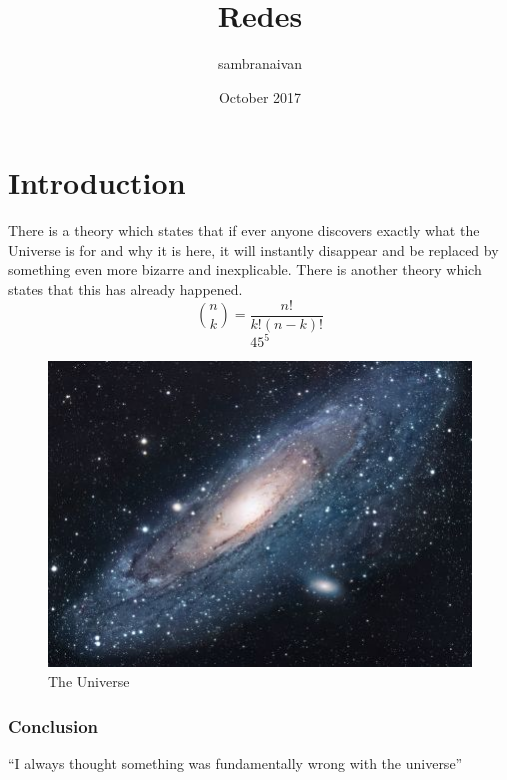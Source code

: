 \documentclass{article}
\title{Redes}
\author{sambranaivan }
\date{October 2017}
\begin{document}
\maketitle

\section{Introduction}
There is a theory which states that if ever anyone discovers exactly what the Universe is for and why it is here, it will instantly disappear and be replaced by something even more bizarre and inexplicable.
There is another theory which states that this has already happened.
\[
    \binom{n}{k} = \frac{n!}{k!(n-k)!}
\]
\[
	45^{5}
\]
\begin{figure}[h!]
\centering
\includegraphics[scale=1.7]{imagenes/universe.jpg}
\caption{The Universe}
\label{fig:univerise}
\end{figure}

\subsubsection{Conclusion}
``I always thought something was fundamentally wrong with the universe'' \citep{adams1995hitchhiker}



\end{document}
